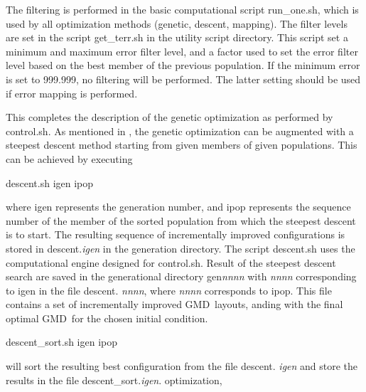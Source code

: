 \documentclass[12pt]{article}
\newcommand{\gmd}{GMD}
\newcommand{\file}{\sf}
\begin{document}
The filtering is performed in the basic computational script {\file
run\_one.sh}, which is used by all optimization methods (genetic, descent,
mapping).  The filter levels are set in the script {\file get\_terr.sh} in the
utility script directory. This script set a minimum and maximum error filter
level, and a factor used to set the error filter level based on the best
member of the previous population. If the minimum error is set to 999.999, no
filtering will be performed. The latter setting should be used if error
mapping is performed.


\vspace{\baselineskip}
\noindent 
This completes the description of the genetic optimization as performed by
{\file control.sh}. As mentioned in \cite{tol:MMAB10d}, the genetic
optimization can be augmented with a steepest descent method starting from
given members of given populations. This can be achieved by executing
\begin{center}
{\file descent.sh igen ipop}
\end{center}
\noindent
where {\file igen} represents the generation number, and {\file ipop}
represents the sequence number of the member of the sorted population from
which the steepest descent is to start. The resulting sequence of
incrementally improved configurations is stored in {\file descent.{\it igen}}
in the generation directory.  The script {\file descent.sh} uses the
computational engine designed for {\file control.sh}. Result of the steepest
descent search are saved in the generational directory {\file gen{\it nnnn}}
with {\it nnnn} corresponding to {\file igen} in the file {\file descent.{\it
nnnn}}, where {\it nnnn} corresponds to {\file ipop}. This file contains a set
of incrementally improved \gmd\ layouts, anding with the final optimal \gmd\
for the chosen initial condition.
\begin{center}
{\file descent\_sort.sh igen ipop}
\end{center}
\noindent
will sort the resulting best configuration from the file {\file descent.{\it
igen}} and store the results in the file {\file descent\_sort.{\it igen}}.
optimization,
\end{document}
